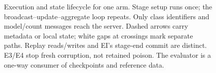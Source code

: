 \begin{figure}[H]
{}
\caption{Execution and state lifecycle for one arm. Stage setup runs once; the broadcast--update--aggregate loop repeats. Only class identifiers and model/count messages reach the server. Dashed arrows carry metadata or local state; white gaps at crossings mark separate paths. Replay reads/writes and EI's stage-end commit are distinct. E3/E4 stop fresh corruption, not retained poison. The evaluator is a one-way consumer of checkpoints and reference data.}
\label{fig:framework}
\end{figure}
